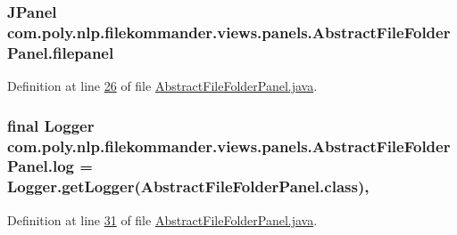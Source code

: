 \hypertarget{classcom_1_1poly_1_1nlp_1_1filekommander_1_1views_1_1panels_1_1_abstract_file_folder_panel_abd069d68f414efb9497427f7df50e7f5}{
\subsubsection[{filepanel}]{\setlength{\rightskip}{0pt plus 5cm}J\-Panel com.\-poly.\-nlp.\-filekommander.\-views.\-panels.\-Abstract\-File\-Folder\-Panel.\-filepanel\hspace{0.3cm}{\ttfamily [private]}}}\label{classcom_1_1poly_1_1nlp_1_1filekommander_1_1views_1_1panels_1_1_abstract_file_folder_panel_abd069d68f414efb9497427f7df50e7f5}


Definition at line \hyperlink{L26}{26} of file \hyperlink{}{Abstract\-File\-Folder\-Panel.\-java}.

\hypertarget{classcom_1_1poly_1_1nlp_1_1filekommander_1_1views_1_1panels_1_1_abstract_file_folder_panel_ac381bcdeb4de3de4b96846422b4db0c4}{
\subsubsection[{log}]{\setlength{\rightskip}{0pt plus 5cm}final Logger com.\-poly.\-nlp.\-filekommander.\-views.\-panels.\-Abstract\-File\-Folder\-Panel.\-log = Logger.\-get\-Logger(Abstract\-File\-Folder\-Panel.\-class)\hspace{0.3cm}{\ttfamily [static]}, {\ttfamily [private]}}}\label{classcom_1_1poly_1_1nlp_1_1filekommander_1_1views_1_1panels_1_1_abstract_file_folder_panel_ac381bcdeb4de3de4b96846422b4db0c4}


Definition at line \hyperlink{L31}{31} of file \hyperlink{}{Abstract\-File\-Folder\-Panel.\-java}.

